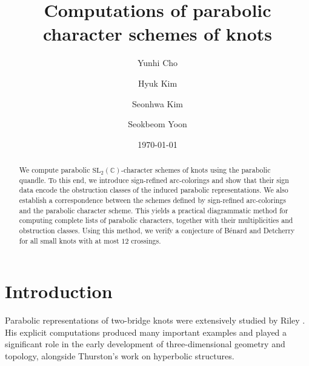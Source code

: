 \documentclass[12pt,reqno]{amsart}
\theoremstyle{definition}
\begin{document}
	
	\title[ ]{Computations of parabolic character schemes of knots}

    \author{Yunhi Cho}
	\address{Department of Mathematics, University of Seoul, Seoul, 02504, Korea}
	
	\author{Hyuk Kim}
	\address{Department of Mathematical Sciences, Seoul National University, Seoul, 08826, Korea}
	
	
	\author{Seonhwa Kim}
	\address{Department of Mathematics, Natural Science Research Institute, University of Seoul, Seoul, 02504, Korea}
		
	\author{Seokbeom Yoon}
	\address{Department of Mathematics, Center for Quantum Computing, Chonnam National University, Gwangju, 61186, Korea}
		
	
	\date{\today}
	
	\begin{abstract}
		We compute parabolic $\mathrm{SL}_2(\mathbb{C})$-character schemes of knots using the parabolic quandle. To this end, we introduce sign-refined arc-colorings and show that their sign data encode the obstruction classes of the induced parabolic representations. We also establish a correspondence between the schemes defined by sign-refined arc-colorings and the parabolic character scheme. This yields a practical diagrammatic method for computing complete lists of parabolic characters, together with their multiplicities and obstruction classes. Using this method, we verify a conjecture of B\'{e}nard and Detcherry for all small knots with at most $12$ crossings.
	\end{abstract}
	\maketitle

    \section{Introduction}\label{sec:introduction}
	
	Parabolic representations of two-bridge knots were extensively studied by Riley \cite{riley_parabolic_1972,riley_parabolic_1975}. His explicit computations produced many important examples and played a significant role in the early development of three-dimensional geometry and topology, alongside Thurston's work on hyperbolic structures.
	
\end{document}
